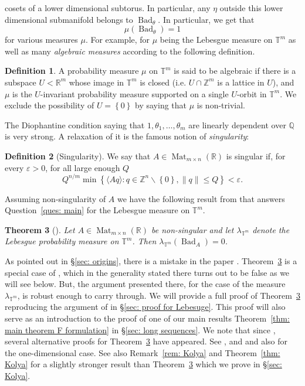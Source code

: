 \documentclass[reqno,11pt, twoside]{amsart}
\theoremstyle{plain}
\newtheorem{thm}{Theorem}[section]
\theoremstyle{definition}
\newtheorem{defn}[thm]{Definition}
\theoremstyle{definition}
\theoremstyle{remark}
\numberwithin{equation}{section}
\newcommand{\sm}{\smallsetminus}
\newcommand{\lam}{\lambda}
\newcommand{\bR}{\mathbb{R}}
\newcommand{\bZ}{\mathbb{Z}}
\newcommand{\bQ}{\mathbb{Q}}
\newcommand{\bT}{\mathbb{T}}
\newcommand\norm[1]{\|#1\|}
\newcommand\seta[1]{\left\{#1\right\}}
\newcommand\idist[1]{\langle#1\rangle}
\newcommand\on[1]{\operatorname{#1}}
\begin{document}
cosets of a lower dimensional subtorus. In particular, any $\eta$ outside this lower dimensional submanifold belongs to $\on{Bad}_\theta$. In particular, we get that 
$$\mu(\on{Bad}_\theta)=1$$
for various measures $\mu$. For example, for $\mu$ being the Lebesgue measure
on $\bT^m$ as well as many \textit{algebraic measures} according to the following definition.
\begin{defn}
    A probability measure $\mu$ on $\bT^m$ is said to be algebraic if there is
    a subspace $U<\bR^m$ whose image in $\bT^m$ is closed (i.e. $U\cap \bZ^m$ is a lattice in $U$), and $\mu$ is the $U$-invariant probability measure supported on a single $U$-orbit in $\bT^m$. We exclude the possibility of 
    $U=\seta{0}$ by saying that $\mu$ is non-trivial.
\end{defn}
The Diophantine condition saying that $1,\theta_1,\dots, \theta_m$ are linearly dependent over $\bQ$ is very strong. A relaxation of it is the famous notion of \textit{singularity}:

\begin{defn}[Singularity]
  We say that $A \in \on{Mat}_{m\times n}(\bR)$ is  singular if, for every $\varepsilon >0$, for all large enough $Q$ 
  \begin{equation}\label{eq: singular defn}
    Q^{n/m}\min\seta{\idist{Aq}: q\in \bZ^n\sm\seta{0}, \norm{q}\le Q}<\varepsilon.
\end{equation}
\end{defn}
Assuming non-singularity of $A$ we have the following result from 
\cite{GDV} that answers Question~\ref{ques: main} for the Lebesgue measure on
$\bT^m$.
\begin{thm}[\cite{GDV}]\label{thm: Uri lebesgue}
    Let $A\in \on{Mat}_{m\times n}(\bR)$ be non-singular and let $\lam_{\bT^m}$ denote the Lebesgue probability measure on $\bT^m$. Then $\lam_{\bT^m}(\on{Bad}_A) = 0$.
\end{thm}
As pointed out in \S\ref{sec: origins}, there is a mistake in the paper \cite{GDV}. Theorem~\ref{thm: Uri lebesgue} is a special case of \cite[Theorem 2.3]{GDV}, which in the generality stated there turns out to be false as we will see below. 
But, the argument presented there, for the case of the measure $\lam_{\bT^m}$, is robust enough to carry through. We will provide a full proof of Theorem~\ref{thm: Uri lebesgue} reproducing the argument of \cite{GDV} in \S\ref{sec: proof for Lebesuge}. 
This proof will also serve as 
an introduction to the proof of one of our main results Theorem~\ref{thm: main theorem F formulation} in \S\ref{sec: long sequences}. 
We note that since \cite{GDV}, several alternative proofs for Theorem~\ref{thm: Uri lebesgue} have appeared. See \cite[Corollary 1.4]{Kim-Kurzweil}, \cite[Theorem 1]{Mosh-welldistributed} and \cite[Theorem 1.3]{BDGW} and also \cite[Theorem 1.2]{DHKim-Nonlinearity} for the one-dimensional case.
See also Remark~\ref{rem: Kolya} and Theorem~\ref{thm: Kolya} for a slightly stronger result than Theorem~\ref{thm: Uri lebesgue} which we 
prove in \S\ref{sec: Kolya}.
\end{document}

